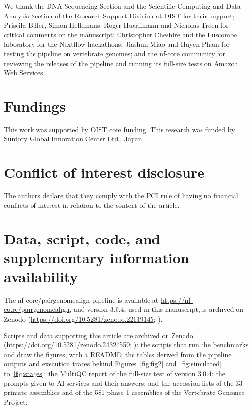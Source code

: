 \documentclass[PCJ,Unicode,screen]{cedram}
\begin{document}
We thank the DNA Sequencing Section and the Scientific Computing and Data Analysis Section of the Research Support Division at OIST for their support; Priscila Biller, Simon Hellemans, Roger Huerlimann and Nicholas Treen for critical comments on the manuscript; Christopher Cheshire and the Luscombe laboratory for the Nextflow hackathons; Jiashun Miao and Huyen Pham for testing the pipeline on vertebrate genomes; and the nf-core community for reviewing the releases of the pipeline and running its full-size tests on Amazon Web Services.

\section*{Fundings}

This work was supported by OIST core funding. This research was funded by Suntory Global Innovation Center Ltd., Japan.

\section*{Conflict of interest disclosure}

The authors declare that they comply with the PCI rule of having no financial conflicts of interest in relation to the content of the article.

\section*{Data, script, code, and supplementary information availability}

The nf-core/pairgenomealign pipeline is available at \url{https://nf-co.re/pairgenomealign}, and version 3.0.4, used in this manuscript, is archived on Zenodo (\url{https://doi.org/10.5281/zenodo.22119145}; \cite{pairgenomealign}).

Scripts and data supporting this article are archived on Zenodo (\url{https://doi.org/10.5281/zenodo.24327550}; \cite{pairgenomealign_paper_data}): the scripts that run the benchmarks and draw the figures, with a README; the tables derived from the pipeline outputs and execution traces behind Figures~\ref{fig:fig2} and~\ref{fig:simulated} to~\ref{fig:stages}; the MultiQC report of the full-size test of version 3.0.4; the prompts given to AI services and their answers; and the accession lists of the 33 primate assemblies and of the 581 phase 1 assemblies of the Vertebrate Genomes Project.

\printbibliography
\end{document}
